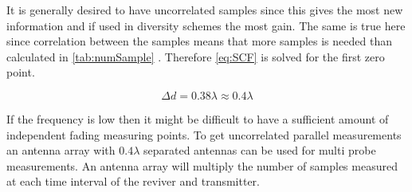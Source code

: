 It is generally desired to have uncorrelated samples since this gives the most new information and if used in diversity schemes the most gain. The same is true here since correlation between the samples means that more samples is needed than calculated in \autoref{tab:numSample} \citep[p.335]{Jakes_microwave}. Therefore \autoref{eq:SCF} is solved for the first zero point.


\begin{equation}
\Delta d = 0.38 \lambda \approx 0.4 \lambda
\end{equation}


If the frequency is low then it might be difficult to have a sufficient amount of independent fading measuring points. \citep[p.11]{UWMeasurement} To get uncorrelated parallel measurements an antenna array with $0.4 \lambda$ separated antennas can be used for multi probe measurements. An antenna array will multiply the number of samples measured at each time interval of the reviver and transmitter. 




